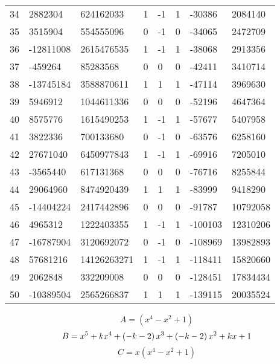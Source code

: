 \documentclass{amsart}
\begin{document}
\begin{longtable}{|l|l|l|lllll|}
34&2882304&624162033&1&-1&1&-30386&2084140\\
35&3515904&554555096&0&-1&0&-34065&2472709\\
36&-12811008&2615476535&1&-1&1&-38068&2913356\\
37&-459264&85283568&0&0&0&-42411&3410714\\
38&-13745184&3588870611&1&1&1&-47114&3969630\\
39&5946912&1044611336&0&0&0&-52196&4647364\\
40&8575776&1615490253&1&-1&1&-57677&5407958\\
41&3822336&700133680&0&-1&0&-63576&6258160\\
42&27671040&6450977843&1&-1&1&-69916&7205010\\
43&-3565440&617131368&0&0&0&-76716&8255844\\
44&29064960&8474920439&1&1&1&-83999&9418290\\
45&-14404224&2417442896&0&0&0&-91787&10792058\\
46&4965312&1222403355&1&-1&1&-100103&12310206\\
47&-16787904&3120692072&0&-1&0&-108969&13982893\\
48&57681216&14126263271&1&-1&1&-118411&15820660\\
49&2062848&332209008&0&0&0&-128451&17834434\\
50&-10389504&2565266837&1&1&1&-139115&20035524\\
\hline
\end{longtable}
$$A=(x^4
 - x^2
 + 1)$$
$$B=x^5
 + k\*x^4
 + \left(-k
 - 2\right) \*x^3
 + \left(-k
 - 2\right) \*x^2
 + k\*x
 + 1$$
$$C=x(x^4
 - x^2
 + 1)$$
\end{document}
